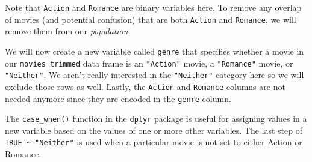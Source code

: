 \documentclass[12pt, krantz2,]{krantz}
\makeatletter
\newenvironment{Shaded}{\begin{snugshade}}{\end{snugshade}}
\newcommand{\DataTypeTok}[1]{\textcolor[rgb]{0.27,0.27,0.27}{#1}}
\newcommand{\DecValTok}[1]{\textcolor[rgb]{0.06,0.06,0.06}{#1}}
\newcommand{\KeywordTok}[1]{\textcolor[rgb]{0.27,0.27,0.27}{\textbf{#1}}}
\newcommand{\NormalTok}[1]{#1}
\newcommand{\OperatorTok}[1]{\textcolor[rgb]{0.43,0.43,0.43}{\textbf{#1}}}
\newcommand{\OtherTok}[1]{\textcolor[rgb]{0.37,0.37,0.37}{#1}}
\newcommand{\StringTok}[1]{\textcolor[rgb]{0.5,0.5,0.5}{#1}}
\newenvironment{kframe}{%
\medskip{}
\setlength{\fboxsep}{.8em}
 \def\at@end@of@kframe{}%
 \ifinner\ifhmode%
  \def\at@end@of@kframe{\end{minipage}}%
  \begin{minipage}{\columnwidth}%
 \fi\fi%
 \def\FrameCommand##1{\hskip\@totalleftmargin \hskip-\fboxsep
 \colorbox{shadecolor}{##1}\hskip-\fboxsep
     \hskip-\linewidth \hskip-\@totalleftmargin \hskip\columnwidth}%
 \MakeFramed {\advance\hsize-\width
   \@totalleftmargin\z@ \linewidth\hsize
   \@setminipage}}%
 {\par\unskip\endMakeFramed%
 \at@end@of@kframe}
\renewenvironment{Shaded}{\begin{kframe}}{\end{kframe}}
\makeatother
\begin{document}
Note that \texttt{Action} and \texttt{Romance} are binary variables here. To remove any overlap of movies (and potential confusion) that are both \texttt{Action} and \texttt{Romance}, we will remove them from our \emph{population}:

\begin{Shaded}
\end{Shaded}

We will now create a new variable called \texttt{genre} that specifies whether a movie in our \texttt{movies\_trimmed} data frame is an \texttt{"Action"} movie, a \texttt{"Romance"} movie, or \texttt{"Neither"}. We aren't really interested in the \texttt{"Neither"} category here so we will exclude those rows as well. Lastly, the \texttt{Action} and \texttt{Romance} columns are not needed anymore since they are encoded in the \texttt{genre} column.

\begin{Shaded}
\end{Shaded}

The \texttt{case\_when()} function in the \texttt{dplyr} package is useful for assigning values in a new variable based on the values of one or more other variables. The last step of \texttt{TRUE\ \textasciitilde{}\ "Neither"} is used when a particular movie is not set to either Action or Romance.
\end{document}
